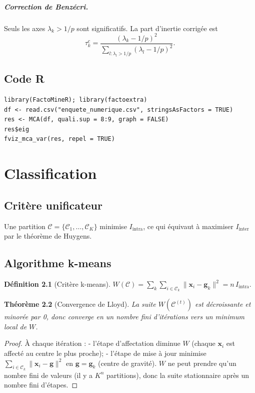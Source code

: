\documentclass[11pt, a4paper, openany]{book}
\theoremstyle{plain}
\newtheorem{theorem}{Théorème}[chapter]
\theoremstyle{definition}
\newtheorem{definition}[theorem]{Définition}
\theoremstyle{remark}
\newcommand{\1}{\mathds{1}}
\begin{document}
\paragraph{Correction de Benzécri.} Seuls les axes $\lambda_k > 1/p$ sont
significatifs. La part d'inertie corrigée est
\[
\tau_k^c = \frac{(\lambda_k - 1/p)^2}{\sum_{l : \lambda_l > 1/p} (\lambda_l - 1/p)^2}.
\]

\section{Code R}
\begin{lstlisting}
library(FactoMineR); library(factoextra)
df <- read.csv("enquete_numerique.csv", stringsAsFactors = TRUE)
res <- MCA(df, quali.sup = 8:9, graph = FALSE)
res$eig
fviz_mca_var(res, repel = TRUE)
\end{lstlisting}

\chapter{Classification}

\section{Critère unificateur}

Une partition $\mathcal{C} = \{\mathcal{C}_1, \ldots, \mathcal{C}_K\}$ minimise
$I_{\text{intra}}$, ce qui équivaut à maximiser $I_{\text{inter}}$ par
le théorème de Huygens.

\section{Algorithme k-means}

\begin{definition}[Critère k-means]
$W(\mathcal{C}) = \sum_k \sum_{i \in \mathcal{C}_k} \|\mathbf{x}_i - \mathbf{g}_k\|^2 = n\, I_{\text{intra}}$.
\end{definition}

\begin{theorem}[Convergence de Lloyd]
La suite $W(\mathcal{C}^{(t)})$ est décroissante et minorée par 0, donc
converge en un nombre fini d'itérations vers un minimum local de $W$.
\end{theorem}

\begin{proof}
À chaque itération :
- l'étape d'affectation diminue $W$ (chaque $\mathbf{x}_i$ est affecté au centre le plus proche);
- l'étape de mise à jour minimise $\sum_{i \in \mathcal{C}_k} \|\mathbf{x}_i - \mathbf{g}\|^2$ en $\mathbf{g} = \mathbf{g}_k$ (centre de gravité).
$W$ ne peut prendre qu'un nombre fini de valeurs (il y a $K^n$ partitions),
donc la suite stationnaire après un nombre fini d'étapes.
\end{proof}
\end{document}
